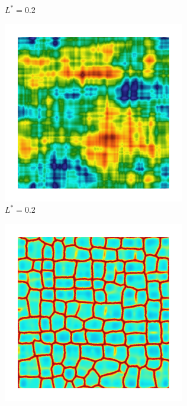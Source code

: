 \begin{figure}[!htbp]
\begin{subfigure}[b]{0.15\textwidth}
    \caption{$L^* = 0.2$}
    \label{fig: Chapter4/2D/Gc_exp_cartesian_20_20_rho_0_seed_b}
  \end{subfigure}
  \begin{subfigure}[b]{0.15\textwidth}
    \includegraphics[width=\textwidth]{Chapter4/figures/2D/psic_exp_cartesian_20_20_rho_0_seed_b.png}
    \caption{$L^* = 0.2$}
    \label{fig: Chapter4/2D/psic_exp_cartesian_20_20_rho_0_seed_b}
  \end{subfigure}
  \begin{subfigure}[b]{0.15\textwidth}
    \includegraphics[width=\textwidth]{Chapter4/figures/2D/d_exp_cartesian_20_20_rho_0_seed_b.png}

\end{subfigure}
\end{figure}
